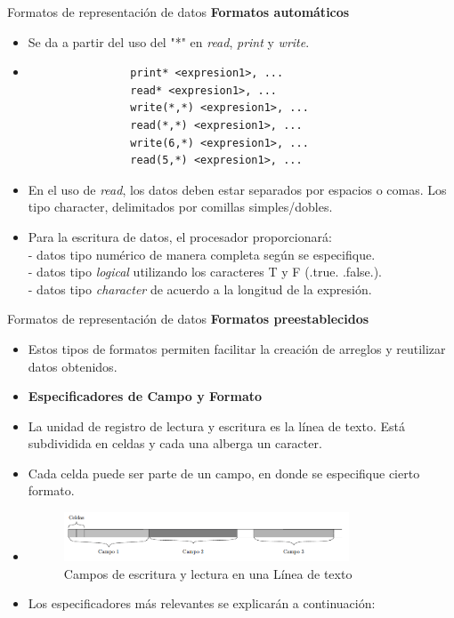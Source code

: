 \begin{frame}[fragile]{Formatos de representación de datos} 
  \textbf{Formatos automáticos}
    \begin{itemize}[<+(1)->] 
        \item Se da a partir del uso del "*" en \emph{read}, \emph{print} y \emph{write}.
          \vspace{0.1cm}
        \item []
            \begin{verbatim}
                print* <expresion1>, ...
                read* <expresion1>, ...
                write(*,*) <expresion1>, ...
                read(*,*) <expresion1>, ...
                write(6,*) <expresion1>, ...
                read(5,*) <expresion1>, ...
            \end{verbatim}
        \item En el uso de \emph{read}, los datos deben estar separados por espacios o comas. Los tipo character, delimitados por comillas simples/dobles.
        \item Para la escritura de datos, el procesador proporcionará: \\ 
        - datos tipo numérico de manera completa según se especifique. \\ 
        - datos tipo \emph{logical} utilizando los caracteres T y F (.true. .false.).\\
        - datos tipo \emph{character} de acuerdo a la longitud de la expresión.
    \end{itemize}
\end{frame}

\begin{frame}[fragile]{Formatos de representación de datos} 
  \textbf{Formatos preestablecidos}
    \begin{itemize}[<+(1)->] 
        \item Estos tipos de formatos permiten facilitar la creación de arreglos y reutilizar datos obtenidos.
        \item [] \textbf{Especificadores de Campo y Formato}
        \item La unidad de registro de lectura y escritura es la línea de texto. Está subdividida en celdas y cada una alberga un caracter.
        \item Cada celda puede ser parte de un campo, en donde se especifique cierto formato.
        \vspace{0.1cm}
        \item []
            \begin{figure}
                \includegraphics[width=0.8\textwidth]{./resources/specifiers.png}
                \caption*{Campos de escritura y lectura en una Línea de texto}
            \end{figure}
        \item Los especificadores más relevantes se explicarán a continuación:
    \end{itemize}
\end{frame}

